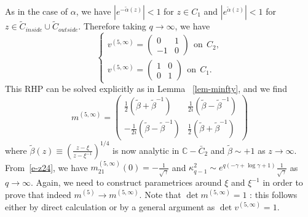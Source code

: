 \documentclass{amsart}
\theoremstyle{definition}
\theoremstyle{remark}
\numberwithin{equation}{section}
\newcommand{\C}{\mathbb C}
\newcommand{\wt}{\widetilde}
\begin{document}
As in the case of $\alpha$, we have $|e^{-\wt{\alpha}(z)}|<1$ for $z\in C_1$ and 
$|e^{\wt{\alpha}(z)}|<1$ for $z\in \wt{C}_{inside}\cup \wt{C}_{outside}$.
Therefore taking $q\to\infty$, we have 
\begin{equation}
\begin{cases}
v^{(5,\infty)} =
 \begin{pmatrix} 0&1\\-1&0 \end{pmatrix} \ \ \text{on} \ \ C_2,\\
v^{(5,\infty)} =
 \begin{pmatrix} 1&0\\0&1 \end{pmatrix} \ \ \text{on} \ \ C_1.
\end{cases}
\end{equation}
This RHP can be solved explicitly as in Lemma ~\ref{lem-minfty}, 
and we find
\begin{equation}\label{e-z24}
m^{(5,\infty)} = \begin{pmatrix} \frac12(\wt{\beta}+\wt{\beta}^{-1})& 
\frac1{2i}(\wt{\beta}-\wt{\beta}^{-1})\\
      -\frac1{2i}(\wt{\beta}-\wt{\beta}^{-1})& 
\frac12(\wt{\beta}+\wt{\beta}^{-1}) \end{pmatrix}
\end{equation}
where $\wt{\beta}(z)\equiv (\frac{z-\xi}{z-\xi^{-1}})^{1/4}$ 
is now analytic in $\C-\bar{C}_2$ and 
$\wt{\beta}\sim +1$ as $z\to\infty$.
From~\eqref{e-z24}, we have $m^{(5,\infty)}_{21}(0)=-\frac1{\sqrt{\gamma}}$ and 
$\kappa^2_{q-1}\sim e^{q(-\gamma+\log \gamma+1)}\frac1{\sqrt{\gamma}}$ 
as $q\to\infty$.
Again, we need to construct parametrices around $\xi$ and $\xi^{-1}$ 
in order to prove 
that indeed $m^{(5)}\to m^{(5,\infty)}$.
Note that $\det m^{(5,\infty)}=1$ : this follows either by direct calculation 
or by a general argument as $\det v^{(5,\infty)}=1$.
\end{document}
